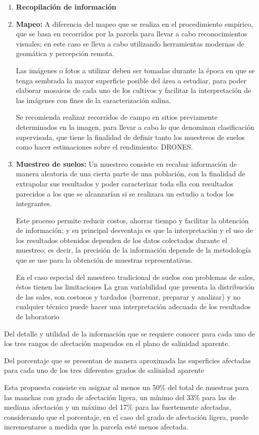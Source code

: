 \begin{enumerate}
  \item \textbf{Recopilación de información}
  \item \textbf{Mapeo:} A diferencia del mapeo que se realiza en el procedimiento empírico, que se basa en recorridos por la parcela para llevar a cabo reconocimientos visuales; en este caso se lleva a cabo utilizando herramientas modernas de geomática y percepción remota.

  Las imágenes o fotos a utilizar deben ser tomadas durante la época en que se tenga sembrada la mayor superficie posible del área a estudiar, para poder elaborar mosaicos de cada uno de los cultivos y facilitar la interpretación de las imágenes con fines de la caracterización salina.
  
  Se recomienda realizar recorridos de campo en sitios previamente determinados en la imagen, para llevar a cabo lo que denominan clasificación supervisada, que tiene la finalidad de definir tanto los muestreos de suelos como hacer estimaciones sobre el rendimiento: DRONES.    
  \item \textbf{Muestreo de suelos:} Un muestreo consiste en recabar información de manera aleatoria de una cierta parte de una población, con la finalidad de extrapolar sus resultados y poder caracterizar toda ella con resultados parecidos a los que se alcanzarían si se realizara un estudio a todos los integrantes.

  Este proceso permite reducir costos, ahorrar tiempo y facilitar la obtención de información; y su principal desventaja es que la interpretación y el uso de los resultados obtenidos dependen de los datos colectados durante el muestreo; es decir, la precisión de la información depende de la metodología que se use para la obtención de muestras representativas.
  
  En el caso especial del muestreo tradicional de suelos con problemas de sales, éstos tienen las limitaciones La gran variabilidad que presenta la distribución de las sales, son costosos y tardados (barrenar, preparar y analizar) y no cualquier técnico puede hacer una interpretación adecuada de los resultados de laboratorio
\end{enumerate}
\begin{definition}
  Del detalle y utilidad de la información que se requiere conocer para cada uno de los tres rangos de afectación mapeados en el plano de salinidad aparente.
  
  Del porcentaje que se presentan de manera aproximada las superficies afectadas para cada uno de los tres diferentes grados de salinidad aparente
\end{definition}
Esta propuesta consiste en asignar al menos un 50\% del total de muestras para las manchas con grado de afectación ligera, un mínimo del 33\% para las de mediana afectación y un máximo del 17\% para las fuertemente afectadas, considerando que el porcentaje, en el caso del grado de afectación ligera, puede incrementarse a medida que la parcela esté menos afectada.


